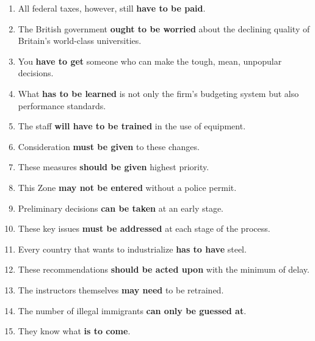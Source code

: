 \documentclass[main.tex]{subfiles}
\begin{document}
\begin{enumerate}[nosep,leftmargin=*]
	\itemsep\eitsp
	\item All federal taxes, however, still \textbf{have to be paid}.
	\item The British government \textbf{ought to be worried} about the declining quality of Britain's world-class universities.
	\item You \textbf{have to get} someone who can make the tough, mean, unpopular decisions.
	\item What \textbf{has to be learned} is not only the firm's budgeting system but also performance standards.
	\item The staff \textbf{will have to be trained} in the use of equipment.
	\item Consideration \textbf{must be given} to these changes.
	\item These measures \textbf{should be given} highest priority.
	\item This Zone \textbf{may not be entered} without a police permit.
	\item Preliminary decisions \textbf{can be taken} at an early stage.
	\item These key issues \textbf{must be addressed} at each stage of the process.
	\item Every country that wants to industrialize \textbf{has to have} steel.
	\item These recommendations \textbf{should be acted upon} with the minimum of delay.
	\item The instructors themselves \textbf{may need} to be retrained.
	\item The number of illegal immigrants \textbf{can only be guessed at}.
	\item They know what \textbf{is to come}.
\end{enumerate}
\

\end{document}
